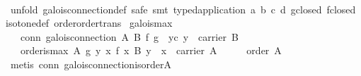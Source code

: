 \begin{isabellebody}
%
\isadelimproof
\ \ %
\endisadelimproof
%
\isatagproof
{}\isamarkupfalse%
\ {}unfold\ galois{}connection{}def{}\ safe{}\ {}smt\ typed{}application\ a\ b\ c\ d\ gclosed\ fclosed\ isotone{}def\ order{}order{}trans{}{}{}%
\endisatagproof
{\isafoldproof}%
%
\isadelimproof
\isanewline
%
\endisadelimproof
\isanewline
\isanewline
\isanewline
\isanewline
\isanewline
\isanewline
\isanewline
{}\isamarkupfalse%
\ galois{}max{}\isanewline
\ \ \ conn{}\ {}galois{}connection\ A\ B\ f\ g{}\ \ yc{}\ {}y\ {}\ carrier\ B{}\isanewline
\ \ \ {}order{}is{}max\ A\ {}g\ y{}\ {}x{}\ f\ x\ {}\isactrlbsub B\isactrlesub \ y\ {}\ x\ {}\ carrier\ A{}{}\isanewline
%
\isadelimproof
%
\endisadelimproof
%
\isatagproof
{}\isamarkupfalse%
\ {}\isanewline
\ \ \isamarkupfalse%
\ {}order\ A{}\ \isamarkupfalse%
\ {}metis\ conn\ galois{}connection{}is{}order{}A{}\isanewline
\ \ \isamarkupfalse%

\end{isabellebody}
